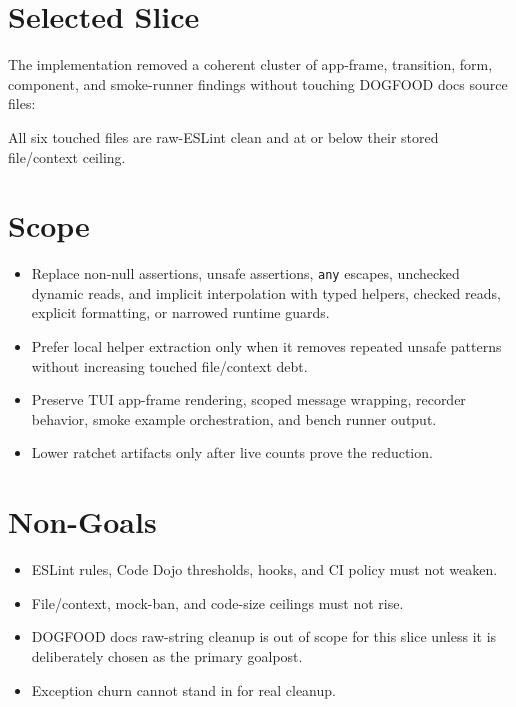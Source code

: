 \section{Selected Slice}\label{record-226-selected-slice}

The implementation removed a coherent cluster of app-frame, transition, form, component, and smoke-runner findings without touching DOGFOOD docs source files:



All six touched files are raw-ESLint clean and at or below their stored file/context ceiling.

\section{Scope}\label{record-226-scope}

\begin{itemize}
\tightlist
\item
  Replace non-null assertions, unsafe assertions, \texttt{a\allowbreak{}n\allowbreak{}y} escapes, unchecked dynamic reads, and implicit interpolation with typed helpers, checked reads, explicit formatting, or narrowed runtime guards.
\item
  Prefer local helper extraction only when it removes repeated unsafe patterns without increasing touched file/context debt.
\item
  Preserve TUI app-frame rendering, scoped message wrapping, recorder behavior, smoke example orchestration, and bench runner output.
\item
  Lower ratchet artifacts only after live counts prove the reduction.
\end{itemize}

\section{Non-Goals}\label{record-226-non-goals}

\begin{itemize}
\tightlist
\item
  ESLint rules, Code Dojo thresholds, hooks, and CI policy must not weaken.
\item
  File/context, mock-ban, and code-size ceilings must not rise.
\item
  DOGFOOD docs raw-string cleanup is out of scope for this slice unless it is deliberately chosen as the primary goalpost.
\item
  Exception churn cannot stand in for real cleanup.
\end{itemize}

